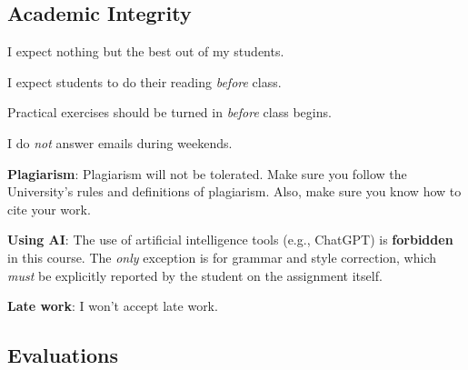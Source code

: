 \documentclass[letterpaper]{article}
\renewenvironment{itemize}{
  \begin{list}{}{
    \setlength{\leftmargin}{1.5em}
  }
}{
  \end{list}
}
\begin{document}
\subsection*{Academic Integrity}

I expect nothing but the best out of my students. 

\begin{itemize}
     \item[$\circ$] I expect students to do their reading \emph{before} class.
     \item[$\circ$] Practical exercises should be turned in \emph{before} class begins. 

  \item[$\circ$] I do \emph{not} answer emails during weekends. 
\end{itemize}


\begin{itemize}
  \item[{\color{red}\Pointinghand}] {\bf Plagiarism}: Plagiarism will not be tolerated. Make sure you follow the University's rules and definitions of plagiarism. Also, make sure you know how to cite your work. 

\item[{\color{red}\Pointinghand}] {\bf Using AI}: The use of artificial intelligence tools (e.g., ChatGPT) is {\bf forbidden} in this course. The \emph{only} exception is for grammar and style correction, which \emph{must} be explicitly reported by the student on the assignment itself.

  \item[{\color{red}\Pointinghand}] {\bf Late work}: I won't accept late work.

\end{itemize}

\subsection*{Evaluations}
\end{document}
